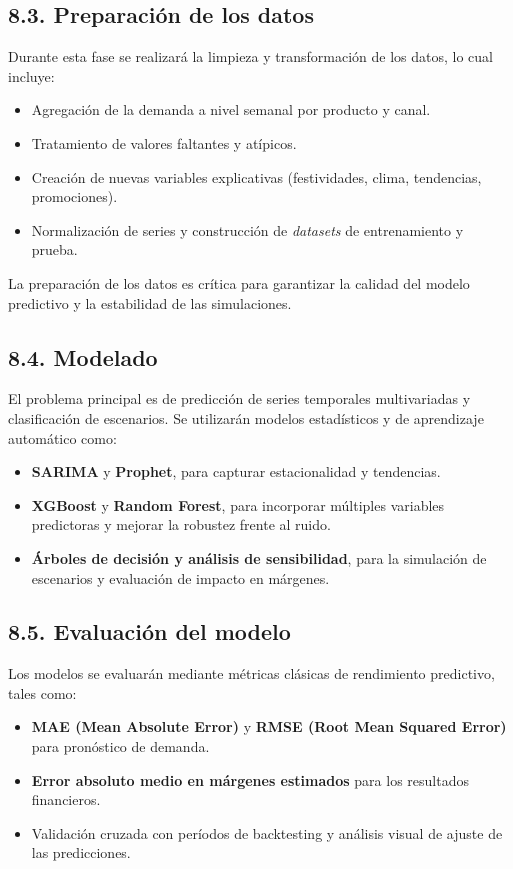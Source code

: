 \documentclass[
11pt, %
]{charter}
\begin{document}
\subsection*{8.3. Preparación de los datos}
Durante esta fase se realizará la limpieza y transformación de los datos, lo cual incluye:
\begin{itemize}
  \item Agregación de la demanda a nivel semanal por producto y canal.
  \item Tratamiento de valores faltantes y atípicos.
  \item Creación de nuevas variables explicativas (festividades, clima, tendencias, promociones).
  \item Normalización de series y construcción de \textit{datasets} de entrenamiento y prueba.
\end{itemize}
La preparación de los datos es crítica para garantizar la calidad del modelo predictivo y la estabilidad de las simulaciones.

\subsection*{8.4. Modelado}
El problema principal es de predicción de series temporales multivariadas y clasificación de escenarios. Se utilizarán modelos estadísticos y de aprendizaje automático como:
\begin{itemize}
  \item \textbf{SARIMA} y \textbf{Prophet}, para capturar estacionalidad y tendencias.
  \item \textbf{XGBoost} y \textbf{Random Forest}, para incorporar múltiples variables predictoras y mejorar la robustez frente al ruido.
  \item \textbf{Árboles de decisión y análisis de sensibilidad}, para la simulación de escenarios y evaluación de impacto en márgenes.
\end{itemize}

\subsection*{8.5. Evaluación del modelo}
Los modelos se evaluarán mediante métricas clásicas de rendimiento predictivo, tales como:
\begin{itemize}
  \item \textbf{MAE (Mean Absolute Error)} y \textbf{RMSE (Root Mean Squared Error)} para pronóstico de demanda.
  \item \textbf{Error absoluto medio en márgenes estimados} para los resultados financieros.
  \item Validación cruzada con períodos de backtesting y análisis visual de ajuste de las predicciones.
\end{itemize}
\end{document}

